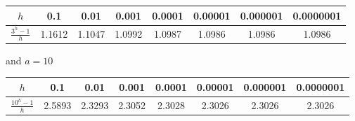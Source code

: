 \begin{eg}
\begin{center}
   \renewcommand{\arraystretch}{1.2}
   \begin{tabular}{|c||c|c|c|c|c|c|c|}
       \hline
       $h$ & 0.1 & 0.01 & 0.001 & 0.0001 & 0.00001 & 0.000001 & 0.0000001 \\
       \hline
       $\tfrac{3^h-1}{h}$ & 1.1612 & 1.1047 & 1.0992 & 1.0987 &
             1.0986 & 1.0986 & 1.0986 \\ \hline
     \end{tabular}
     \renewcommand{\arraystretch}{1.0}
\end{center}
and $a=10$
\begin{center}
   \renewcommand{\arraystretch}{1.2}
   \begin{tabular}{|c||c|c|c|c|c|c|c|}
       \hline
       $h$ & 0.1 & 0.01 & 0.001 & 0.0001 & 0.00001 & 0.000001 & 0.0000001 \\
       \hline
       $\tfrac{10^h-1}{h}$ & 2.5893 & 2.3293 & 2.3052 & 2.3028 &
             2.3026 & 2.3026 & 2.3026 \\ \hline
     \end{tabular}
     \renewcommand{\arraystretch}{1.0}
\end{center}
%

\end{eg}
